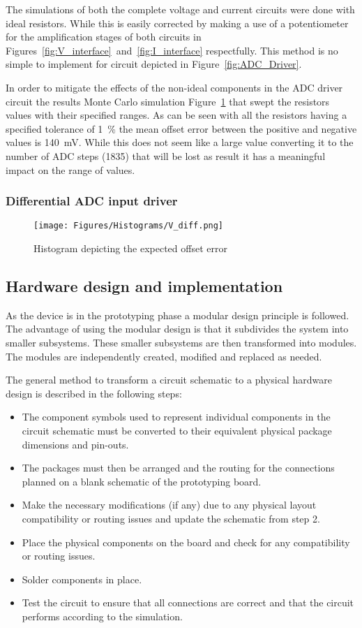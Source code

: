 The simulations of both the complete voltage and current circuits were done with ideal resistors. While this is easily corrected by making a use of a potentiometer for the amplification stages of both circuits in Figures~\ref{fig:V_interface}~and~\ref{fig:I_interface} respectfully. This method is no simple to implement for circuit depicted in Figure~\ref{fig:ADC_Driver}.
\par
In order to mitigate the effects of the non-ideal components in the ADC driver circuit the results Monte Carlo simulation Figure~\ref{fig:Hist_ADC_Driver} that swept the resistors values with their specified ranges. As can be seen with all the resistors having a specified tolerance of \qty{1}{\percent} the mean offset error between the positive and negative values is \qty{140}{\mV}. While this does not seem like a large value converting it to the number of ADC steps (1835) that will be lost as result it has a meaningful impact on the range of values. 
\subsubsection{Differential ADC input driver}
\begin{figure}[H]
    \centering
    \texttt{[image: Figures/Histograms/V\_diff.png]}
    \caption{Histogram depicting the expected offset error}
    \label{fig:Hist_ADC_Driver}
\end{figure}

\subsection{Hardware design and implementation}
\label{sec:Hardware_imp}
As the device is in the prototyping phase a modular design principle is followed. The advantage of using the modular design is that it subdivides the system into smaller subsystems. These smaller subsystems are then transformed into modules. The modules are independently created, modified and replaced as needed.
\par 
The general method to transform a circuit schematic to a physical hardware design is described in the following steps:
\begin{itemize}
    \item [Step 1:] The component symbols used to represent individual components in the circuit schematic must be converted to their equivalent physical package dimensions and pin-outs. 
    \item [Step 2:] The packages must then be arranged and the routing for the connections planned on a blank schematic of the prototyping board.
    \item [Step 3:] Make the necessary modifications (if any) due to any physical layout compatibility or routing issues and update the schematic from step 2.
    \item [Step 4:] Place the physical components on the board and check for any compatibility or routing issues.
    \item [Step 5:] Solder components in place.
    \item [Step 6:] Test the circuit to ensure that all connections are correct and that the circuit performs according to the simulation.
\end{itemize}
